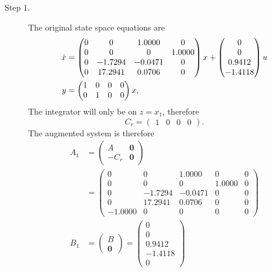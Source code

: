 
\begin{description}
\item[Step 1.]
The original state space equations are 
\begin{align}
\dot{x} &= \begin{pmatrix}
0 &        0 &   1.0000 &        0 \\
0 &        0 &        0 &   1.0000 \\
0 &  -1.7294 &   -0.0471 &        0 \\
0 &  17.2941 &   0.0706 &        0 \\
\end{pmatrix} x + \begin{pmatrix}
0 \\
0 \\
0.9412 \\
-1.4118 \\
\end{pmatrix} u \notag \\
y &= \begin{pmatrix}
1 & 0 & 0 & 0 \\
0 & 1 & 0 & 0 
\end{pmatrix} x, \label{eq:hw_state_feedback_b1}
\end{align}
The integrator will only be on $z=x_1$, therefore 
\[
C_r = \begin{pmatrix} 1 & 0 & 0 & 0 \end{pmatrix}.
\]
The augmented system is therefore
\begin{align*}
A_1 &= \begin{pmatrix} A & \mathbf{0} \\ -C_r & \mathbf{0} \end{pmatrix} \\ &= \begin{pmatrix} 
         0 &        0 &   1.0000 &        0  &       0 \\
         0 &        0 &        0 &   1.0000  &       0 \\ 
         0 &  -1.7294 &  -0.0471 &        0  &       0 \\
         0 &  17.2941 &   0.0706 &        0  &       0 \\
    -1.0000 &        0 &        0 &        0  &       0
\end{pmatrix} \\
B_1 &= \begin{pmatrix} B \\ \mathbf{0} \end{pmatrix} = \begin{pmatrix} 
0   \\      0  \\  0.9412 \\  -1.4118   \\      0 
\end{pmatrix}
\end{align*}


\end{description}
